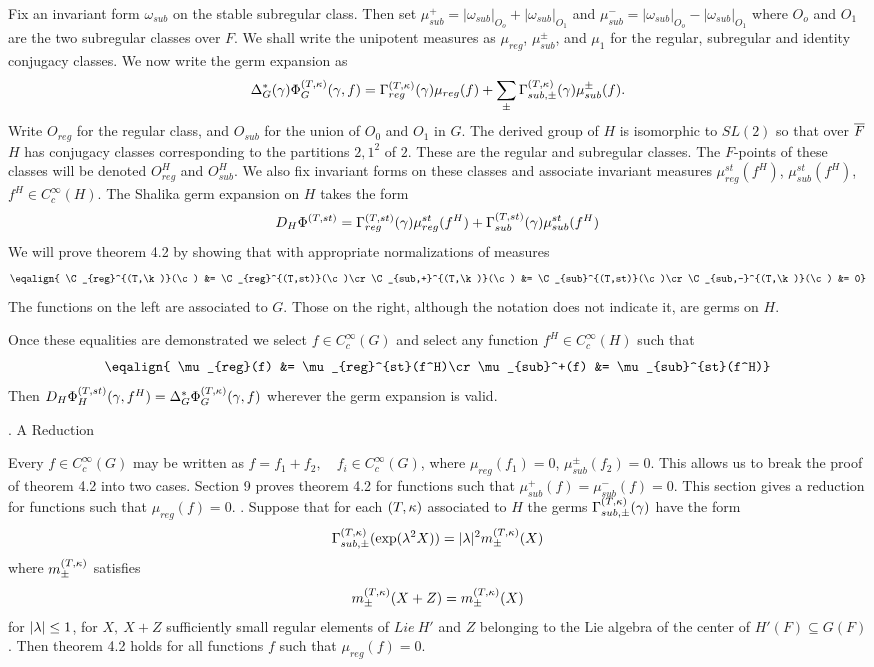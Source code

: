 Fix an invariant form $\omega_{sub}$ on the stable subregular class.
Then set $\mu_{sub}^+ = |\omega_{sub}|_{O_o} + |\omega_{sub}|_{O_1}$
and $\mu_{sub}^- = |\omega_{sub}|_{O_o} - |\omega_{sub}|_{O_1}$ where
$O_o$ and $O_1$ are the two subregular classes over $F$.
We shall write the unipotent measures as $\mu_{reg}$,
$\mu_{sub}^{\pm}$, and $\mu_1$ for the regular, subregular and identity
conjugacy classes.  We now write the germ expansion as 
$$\Delta^*_G({\gamma})\Phi^{(T,\kappa)}_G({\gamma},f) = \Gamma^{(T,{\kappa})}_{reg}({\gamma})\mu_{reg}(f) + \sum_\pm
\Gamma^{(T,{\kappa})}_{sub,\pm}({\gamma}) \mu_{sub}^{\pm}(f).$$  
Write $O_{reg}$ for the regular class, and  $O_{sub}$ for the union of $O_0$
and $O_1$ in $G$.
The derived group of $H$ is isomorphic to $SL(2)$ so that over $\overline{F}$
$H$ has conjugacy classes corresponding to the partitions $2,1^2$ of $2$.
These are the regular and subregular classes.  The $F$-points of these
classes will be denoted $O_{reg}^H$ and $O_{sub}^H$.  We also fix
invariant forms on these classes and associate invariant measures
$\mu_{reg}^{st}(f^H)$, $\mu_{sub}^{st}(f^H)$, $f^H\in C_c^\infty(H)$.
  The Shalika germ expansion on $H$ takes the form
$$D_H\Phi^{(T,st)}={\Gamma}_{reg}^{(T,st)}({\gamma})\mu_{reg}^{st}(f^H) +
{\Gamma}_{sub}^{(T,st)}({\gamma})\mu_{sub}^{st}(f^H)$$
We will prove theorem 4.2 by showing that with appropriate
normalizations of measures 
$$\eqalign{
\C_{reg}^{(T,\k)}(\c) &= \C_{reg}^{(T,st)}(\c)\cr
\C_{sub,+}^{(T,\k)}(\c) &= \C_{sub}^{(T,st)}(\c)\cr
\C_{sub,-}^{(T,\k)}(\c) &= 0}$$
The functions on the left are associated to $G$.  Those on the right,
although the notation does not indicate it, are germs  on 
$H$.

Once these equalities are demonstrated we select $f\in C_c^\infty(G)$
and select any function $f^H\in C_c^\infty(H)$ such that
$$\eqalign{
\mu_{reg}(f) &= \mu_{reg}^{st}(f^H)\cr
\mu_{sub}^+(f) &= \mu_{sub}^{st}(f^H)}$$
Then $D_H\Phi^{(T,st)}_H({\gamma},f^H) = \Delta_G^*\Phi^{(T,\kappa)}_G({\gamma},f)$ wherever the germ
expansion is valid.


.      A	Reduction 
\endsect

Every $f \in C_c^\infty(G)$ may be written as $f = f_1 + f_2,\quad f_i \in
C_c^\infty(G)$, where $\mu_{reg}(f_1)=0$, $\mu_{sub}^\pm(f_2)=0$.
This allows us to break the proof of theorem 4.2 into two cases.  Section 9 proves theorem 4.2 for functions such that $\mu_{sub}^+(f)=\mu_{sub}^-(f)=0$.  This section gives a reduction for functions such that $\mu_{reg}(f)=0$.  
.
Suppose that for each $(T,{\kappa})$ associated to $H$
the germs ${\Gamma}_{sub,\pm}^{(T,{\kappa})}({\gamma})$ have the form $$
{\Gamma}_{sub,\pm}^{(T,{\kappa})}(\exp ({\lambda}^2 X)) = |{\lambda}|^2 m^{(T,{\kappa})}_{\pm}(X) $$ where $m^{(T,{\kappa})}_\pm$
satisfies 
$$m^{(T,{\kappa})}_{\pm}(X+Z) = m^{(T,{\kappa})}_{\pm}(X)$$ for $|{\lambda}| \le 1 $, for $X, \ X+Z $ sufficiently
small regular elements of $Lie \ H'$ and $Z $ belonging to the Lie
algebra of the center of $H'(F) \subseteq G(F)$.  Then theorem 4.2 holds for all
functions $f$ such that $\mu_{reg}(f) =0$.  

